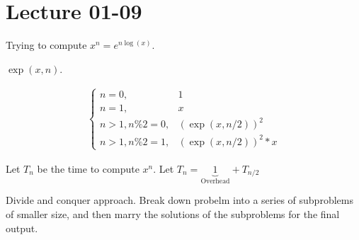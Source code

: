 \documentclass[class=scrartcl, crop=false]{standalone}
\date{2020-01-09}
\begin{document}
\section{Lecture 01-09}

Trying to compute $x^n = e^{n\log(x)}$. %

$\exp(x, n)$.

\begin{gather*}
  \begin{cases}
    n = 0, & 1 \\
    n = 1, & x \\
    n > 1, n \% 2 = 0, & (\exp(x, n / 2))^2 \\
    n > 1, n \%2 = 1, & (\exp(x, n / 2))^2 * x
  \end{cases} 
\end{gather*} 

Let $T_n$ be the time to compute $x^n$. Let $T_n = \underbrace{1}_{\text{Overhead}} + T_{n / 2}$

Divide and conquer approach. Break down probelm into a series of subproblems of smaller size, and then marry the solutions of the subproblems for the final output.
\end{document}
